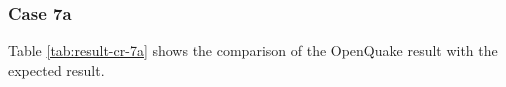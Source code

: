 \subsubsection{Case 7a}




Table \ref{tab:result-cr-7a} shows the comparison of the OpenQuake result with the expected result.

